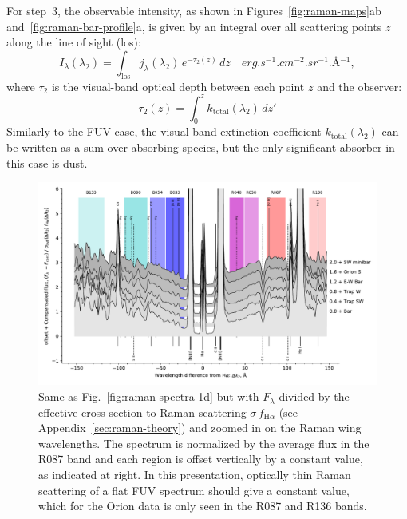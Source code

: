 \documentclass[useAMS, usenatbib, a4paper]{mnras}
\newcommand\ha{\ensuremath{\text{H}\alpha}}
\begin{document}
For step~3, the observable intensity,
as shown in Figures~\ref{fig:raman-maps}ab and~\ref{fig:raman-bar-profile}a,
is given by an integral over all scattering points \(z\) along the line of sight (los):
\begin{equation}
  \label{eq:formal-solution}
  I_\lambda (\lambda_2) = \int_{\text{los}} j_\lambda(\lambda_2) \, e^{-\tau_2(z)} \, dz
  \quad \si{erg.s^{-1}.cm^{-2}.sr^{-1}.\angstrom^{-1}} ,
\end{equation}
where \(\tau_2\) is the visual-band optical depth between each point \(z\)
and the observer:
\begin{equation}
  \label{eq:tau-visual}
  \tau_2(z) = \int_0^z k_{\text{total}} (\lambda_2) \, dz'
\end{equation}
Similarly to the FUV case,
the visual-band extinction coefficient \( k_{\text{total}} (\lambda_2)\)
can be written as a sum over absorbing species,
but the only significant absorber in this case is dust.

\begin{figure}
  \centering
  \includegraphics[width=\linewidth]{figs/raman-muse-spectra-compensated}
  \caption{Same as Fig.~\ref{fig:raman-spectra-1d} but with
    \(F_\lambda\) divided by the effective cross section to Raman scattering
    \(\sigma\, f_{\ha}\) (see Appendix~\ref{sec:raman-theory})
    and zoomed in on the Raman wing
    wavelengths.  The spectrum is normalized by the average flux in
    the R087 band and each region is offset vertically by a constant
    value, as indicated at right.  In this presentation, optically
    thin Raman scattering of a flat FUV spectrum should give a
    constant value, which for the Orion data is only seen in the R087
    and R136 bands.}
  \label{fig:raman-compensated}
\end{figure}
\end{document}
